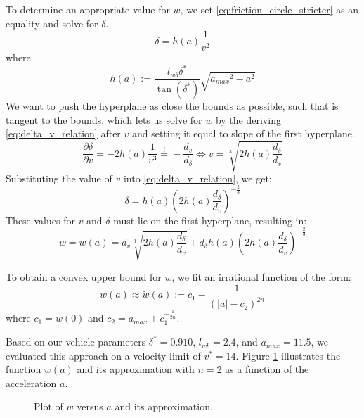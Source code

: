 To determine an appropriate value for $w$, we set \eqref{eq:friction_circle_stricter} as an equality and solve for $\delta$.
\begin{equation}
	\delta = h(a) \frac{1}{v^2}
	\label{eq:delta_v_relation}
\end{equation}
where \[h(a):=\frac{l_{wb} \delta^*}{\tan(\delta^*)}\sqrt{{a_{max}}^2 - a^2}\]
We want to push the hyperplane as close the bounds as possible, such that is tangent to the bounds, which lets us solve for $w$ by the deriving \eqref{eq:delta_v_relation} after $v$ and setting it equal to slope of the first hyperplane.
\begin{equation}
	\frac{\partial\delta}{\partial v} = -2 h(a) \frac{1}{v^3} \overset{!}{=} -\frac{d_v}{d_\delta} \iff v = \sqrt[3]{2h(a)\frac{d_\delta}{d_v}}
\end{equation}
Substituting the value of $v$ into \eqref{eq:delta_v_relation}, we get:
\begin{equation}
	\delta = h(a) \left(2h(a)\frac{d_\delta}{d_v}\right)^{-\frac{2}{3}}
\end{equation}
These values for $v$ and $\delta$ must lie on the first hyperplane, resulting in:
\begin{equation}
	w = w(a) = d_v \sqrt[3]{2h(a)\frac{d_\delta}{d_v}} + d_\delta h(a) \left(2h(a)\frac{d_\delta}{d_v}\right)^{-\frac{2}{3}}
\end{equation}

To obtain a convex upper bound for $w$, we fit an irrational function of the form:
\begin{equation}
	w(a) \approx \tilde{w}(a) := c_1 - \frac{1}{(|a| - c_2)^{2n}}
	\label{eq:fitting_irrational}
\end{equation}
where $c_1 = w(0)$ and $c_2 = a_{max} + c_1^{-\frac{1}{2n}}$.

Based on our vehicle parameters $\delta^*=0.910$, $l_{wb}=2.4$, and $a_{max}=11.5$, we evaluated this approach on a velocity limit of $v^*=14$.
Figure \ref{fig:w_vs_a} illustrates the function $w(a)$ and its approximation with $n=2$ as a function of the acceleration $a$.

\begin{figure}[h]\centering
	\caption{Plot of $w$ versus $a$ and its approximation.}
	\label{fig:w_vs_a}
\end{figure}

